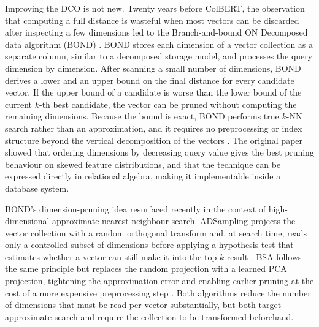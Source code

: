 Improving the DCO is not new. Twenty years before ColBERT, the observation that 
computing a full distance is wasteful when most vectors can be discarded after 
inspecting a few dimensions led to the Branch-and-bound ON Decomposed data 
algorithm (BOND) \citep{devries2002bond}. BOND stores each dimension of a vector 
collection as a separate column, similar to a decomposed storage model, and processes 
the query dimension by dimension. After scanning a small number of dimensions, BOND 
derives a lower and an upper bound on the final distance for every candidate vector. 
If the upper bound of a candidate is worse than the lower bound of the current $k$-th 
best candidate, the vector can be pruned without computing the remaining dimensions. 
Because the bound is exact, BOND performs true $k$-NN search rather than an approximation, 
and it requires no preprocessing or index structure beyond the vertical decomposition 
of the vectors \citep{devries2002bond}. The original paper showed that ordering dimensions 
by decreasing query value gives the best pruning behaviour on skewed feature distributions, 
and that the technique can be expressed directly in relational algebra, making it implementable 
inside a database system.

BOND's dimension-pruning idea resurfaced recently in the context of high-dimensional 
approximate nearest-neighbour search. ADSampling projects the vector collection with 
a random orthogonal transform and, at search time, reads only a controlled subset of 
dimensions before applying a hypothesis test that estimates whether a vector can still 
make it into the top-$k$ result \citep{gao2023adsampling}. BSA follows the same principle 
but replaces the random projection with a learned PCA projection, tightening the 
approximation error and enabling earlier pruning at the cost of a more expensive 
preprocessing step \citep{yang2024bsa}. Both algorithms reduce the number of dimensions 
that must be read per vector substantially, but both target approximate search and 
require the collection to be transformed beforehand.

